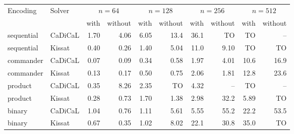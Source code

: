 \begin{tabular}{@{}llrrrrrrrr@{}}
\toprule
Encoding & Solver & \multicolumn{2}{c}{$n=64$} & \multicolumn{2}{c}{$n=128$} & \multicolumn{2}{c}{$n=256$} & \multicolumn{2}{c}{$n=512$} \\
\cmidrule(lr){3-4}\cmidrule(lr){5-6}\cmidrule(lr){7-8}\cmidrule(lr){9-10}
 & & with & without & with & without & with & without & with & without \\
\midrule
sequential & CaDiCaL & 1.70 & 4.06 & 6.05 & 13.4 & 36.1 & TO & TO & -- \\
sequential & Kissat & 0.40 & 0.26 & 1.40 & 5.04 & 11.0 & 9.10 & TO & TO \\
commander & CaDiCaL & 0.07 & 0.09 & 0.34 & 0.58 & 1.97 & 4.01 & 10.6 & 16.9 \\
commander & Kissat & 0.13 & 0.17 & 0.50 & 0.75 & 2.06 & 1.81 & 12.8 & 23.6 \\
product & CaDiCaL & 0.35 & 8.26 & 2.35 & TO & 4.32 & -- & TO & -- \\
product & Kissat & 0.28 & 0.73 & 1.70 & 1.38 & 2.98 & 32.2 & 5.89 & TO \\
binary & CaDiCaL & 1.04 & 0.76 & 1.11 & 5.61 & 5.55 & 55.2 & 22.2 & 53.5 \\
binary & Kissat & 0.67 & 0.35 & 1.02 & 8.02 & 22.1 & 30.8 & 35.0 & TO \\
\bottomrule
\end{tabular}
